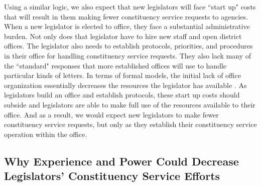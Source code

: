 \documentclass[12pt]{article}
\begin{document}
Using a similar logic, we also expect that new legislators will face ``start up" costs that will result in them making fewer constituency service requests to agencies.  When a new legislator is elected to office, they face a substantial administrative burden.  Not only does that legislator have to hire new staff and open district offices.  The legislator also needs to establish protocols, priorities, and procedures in their office for handling constituency service requests.  They also lack many of the ``standard" responses that more established offices will use to handle particular kinds of letters.  In terms of formal models, the initial lack of office organization essentially decreases the resources the legislator has available \citep{AshworthBuenodeMesquita2006}.  As legislators build an office and establish protocols, these start up costs should subside and legislators are able to make full use of the resources available to their office.  And as a result, we would expect new legislators to make fewer constituency service requests, but only as they establish their constituency service operation within the office.    


\subsection{Why Experience and Power Could Decrease Legislators' Constituency Service Efforts}
\end{document}
